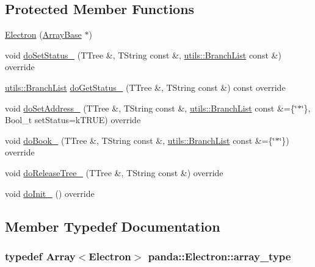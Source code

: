 \subsection*{Protected Member Functions}
\begin{DoxyCompactItemize}
\item 
\hyperlink{classpanda_1_1Electron_a1a164e9604f2796faf0702bb82a08fc6}{Electron} (\hyperlink{classpanda_1_1ArrayBase}{ArrayBase} $\ast$)
\item 
void \hyperlink{classpanda_1_1Electron_af73c3c5f59267c4bba4ceb0a47cfc6ec}{doSetStatus\_\-} (TTree \&, TString const \&, \hyperlink{classpanda_1_1utils_1_1BranchList}{utils::BranchList} const \&) override
\item 
\hyperlink{classpanda_1_1utils_1_1BranchList}{utils::BranchList} \hyperlink{classpanda_1_1Electron_a3e2097c55d5ab63188d0c04426e47248}{doGetStatus\_\-} (TTree \&, TString const \&) const override
\item 
void \hyperlink{classpanda_1_1Electron_a4da89a6071eab568e7aba8b61d2888a2}{doSetAddress\_\-} (TTree \&, TString const \&, \hyperlink{classpanda_1_1utils_1_1BranchList}{utils::BranchList} const \&=\{\char`\"{}$\ast$\char`\"{}\}, Bool\_\-t setStatus=kTRUE) override
\item 
void \hyperlink{classpanda_1_1Electron_a2b2000f57a7f009c12bdf33f25d50350}{doBook\_\-} (TTree \&, TString const \&, \hyperlink{classpanda_1_1utils_1_1BranchList}{utils::BranchList} const \&=\{\char`\"{}$\ast$\char`\"{}\}) override
\item 
void \hyperlink{classpanda_1_1Electron_a728ea4bc877ba68f1a8e7301ea712871}{doReleaseTree\_\-} (TTree \&, TString const \&) override
\item 
void \hyperlink{classpanda_1_1Electron_a87826542cbfbde4305c312ffa677d1bf}{doInit\_\-} () override
\end{DoxyCompactItemize}


\subsection{Member Typedef Documentation}
\hypertarget{classpanda_1_1Electron_a7bfeb05c19bc521a2e12e1704cc16958}{
\subsubsection[{array\_\-type}]{\setlength{\rightskip}{0pt plus 5cm}typedef {\bf Array}$<${\bf Electron}$>$ {\bf panda::Electron::array\_\-type}}}
\label{classpanda_1_1Electron_a7bfeb05c19bc521a2e12e1704cc16958}


